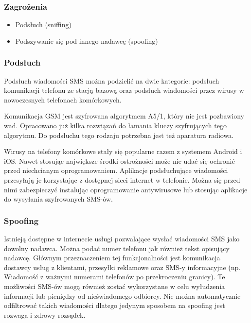 \documentclass[xcolor=table]{beamer}
\begin{document}
\begin{frame}
  \frametitle{Zagrożenia}

\begin{itemize}
  \item Podsłuch (sniffing) 
  \item Podszywanie się pod innego nadawcę (spoofing)
\end{itemize}

\end{frame}

\begin{frame}[allowframebreaks]
  \frametitle{Podsłuch}

  Podsłuch wiadomości SMS można podzielić na dwie kategorie: podsłuch
  komunikacji telefonu ze stacją bazową oraz podsłuch wiadomości przez wirusy w
  nowoczesnych telefonach komórkowych.

  Komunikacja GSM jest szyfrowana algorytmem A5/1, który nie jest pozbawiony
  wad. Opracowano już kilka rozwiązań do łamania kluczy szyfrujących tego
  algorytmu. Do podsłuchu tego rodzaju potrzebna jest też aparatura radiowa.

  \framebreak

  Wirusy na telefony komórkowe stały się popularne razem z systemem Android i
  iOS. Nawet stosując największe środki ostrożności może nie udać się ochronić
  przed niechcianym oprogramowaniem. Aplikacje podsłuchujące wiadomości
  przesyłają je korzystając z dostępnej sieci internet w telefonie. 
  Można się przed nimi zabezpieczyć instalując oprogramowanie
  antywirusowe lub stosując aplikacje do wysyłania szyfrowanych SMS-ów.
\end{frame}

\begin{frame}
  \frametitle{Spoofing}
  
  Istnieją dostępne w internecie usługi pozwalające wysłać wiadomości SMS jako
  dowolny nadawca. Można podać numer telefonu jak również tekst opisujący
  nadawcę. Głównym przeznaczeniem tej funkcjonalności jest komunikacja dostawcy
  usług z klientami, przesyłki reklamowe oraz SMS-y informacyjne (np. Wiadomość
  z ważnymi numerami telefonów po przekroczeniu granicy). Te możliwości SMS-ów
  mogą również zostać wykorzystane w celu wyłudzenia informacji lub pieniędzy
  od nieświadomego odbiorcy. Nie można automatycznie odfiltrować takich
  wiadomości dlatego jedynym sposobem na spoofing jest rozwaga i zdrowy
  rozsądek.

\end{frame}
\end{document}

